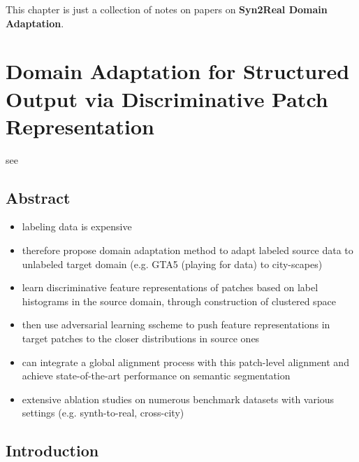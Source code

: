 \documentclass[]{article}
\title{}
\author{}
\begin{document}
	
	\maketitle

This chapter is just a collection of notes on papers on \textbf{Syn2Real Domain Adaptation}.

\section{Domain Adaptation for Structured Output via Discriminative Patch Representation}

see \cite{Tsai2019DomainAF}

\subsection{Abstract}
\begin{itemize}
	\item labeling data is expensive
	\item therefore propose domain adaptation method to adapt labeled source data to unlabeled target domain (e.g. GTA5 (playing for data) to city-scapes)
	\item learn discriminative feature representations of patches based on label histograms in the source domain, through construction of clustered space
	\item then use adversarial learning sscheme to push feature representations in target patches to the closer distributions in source ones
	\item can integrate a global alignment process with this patch-level alignment and achieve state-of-the-art performance on semantic segmentation
	\item extensive ablation studies on numerous benchmark datasets with various settings (e.g. synth-to-real, cross-city)
\end{itemize}

\subsection{Introduction}
\end{document}
